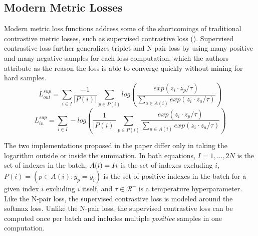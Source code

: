 \documentclass[./dissertation.tex]{subfiles}
\begin{document}
    \subsection{Modern Metric Losses}
    Modern metric loss functions address some of the shortcomings of traditional contrastive metric losses, such as supervised contrastive loss (\cite{khosla2020supervised}). Supervised contrastive loss further generalizes triplet and N-pair loss by using many positive and many negative samples for each loss computation, which the authors attribute as the reason the loss is able to converge quickly without mining for hard samples. \\ 
    
    \begin{equation*}
    L_{out}^{sup} = \sum_{i \in I} \frac{-1}{|P(i)|}
    \sum_{p \in P(i)}log(\frac{exp(z_{i} \cdot z_{p} / \tau)}
    {\sum_{a \in A(i)}exp(z_{i} \cdot z_{a} / \tau)}) 
    \end{equation*} 
    \begin{equation*}
    L_{in}^{sup} = \sum_{i \in I} -log(\frac{1}{|P(i)|}\sum_{p \in P(i)}
    \frac{exp(z_{i} \cdot z_{p} / \tau)}
    {\sum_{a \in A(i)}exp(z_{i} \cdot z_{a} / \tau)}) 
    \end{equation*}
    
    The two implementations proposed in the paper differ only in taking the logarithm outside or inside the summation. In both equations, $I = {1, ..., 2N}$ is the set of indexes in the batch, $A(i) = I \\ i$ is the set of indexes excluding $i$, $P(i) = (p \in A(i) : y_{p} = y _{i})$ is the set of positive indexes in the batch for a given index $i$ excluding $i$ itself, and $\tau \in \mathcal{R}^{+}$ is a temperature hyperparameter. Like the N-pair loss, the supervised contrastive loss is modeled around the softmax loss. Unlike the N-pair loss, the supervised contrastive loss can be computed once per batch and includes multiple \textit{positive} samples in one computation. \\
    
\end{document}

